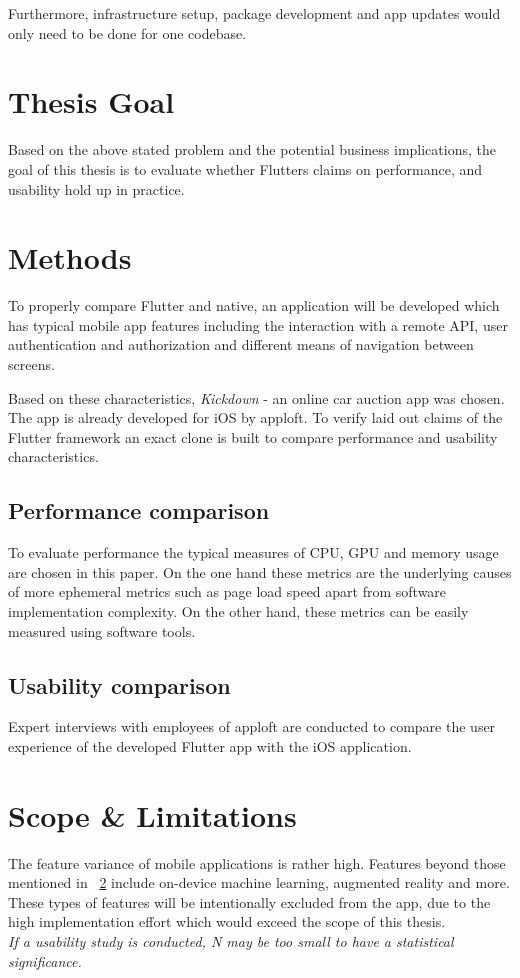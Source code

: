 Furthermore, infrastructure setup, package development and app updates would only need to be done for one codebase.

\section{Thesis Goal}
Based on the above stated problem and the potential business implications, the goal of this thesis is to evaluate 
whether Flutters claims on performance, and usability hold up in practice.

\section{Methods}
\label{section:methods}
To properly compare Flutter and native, an application will be developed which has typical mobile app features 
including the interaction with a remote API, user authentication and authorization and different means of navigation between screens.

Based on these characteristics, \textit{Kickdown} - an online car auction app was chosen. 
The app is already developed for iOS by apploft.
To verify laid out claims of the Flutter framework an exact clone is built to compare performance and usability characteristics.

\subsection{Performance comparison}
To evaluate performance the typical measures of CPU, GPU and memory usage are chosen in this paper. 
On the one hand these metrics are the underlying causes of more ephemeral metrics such as page load speed 
apart from software implementation complexity. On the other hand, these metrics can be easily measured using software tools.

\subsection{Usability comparison}
Expert interviews with employees of apploft are conducted to compare the user experience of the developed Flutter app with the iOS application.

\section{Scope \& Limitations}
The feature variance of mobile applications is rather high. 
Features beyond those mentioned in ~\ref{section:methods} include on-device machine learning, augmented reality and more. 
These types of features will be intentionally excluded from the app, 
due to the high implementation effort which would exceed the scope of this thesis.\\
\textit{If a usability study is conducted, N may be too small to have a statistical significance.}

